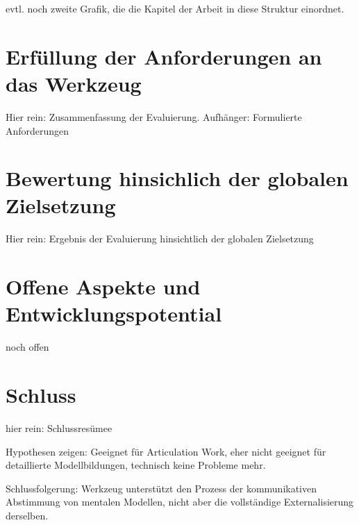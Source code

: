 evtl. noch zweite Grafik, die die Kapitel der Arbeit in diese Struktur einordnet.


\section{Erfüllung der Anforderungen an das Werkzeug}

Hier rein: Zusammenfassung der Evaluierung. Aufhänger: Formulierte Anforderungen

\section{Bewertung hinsichlich der globalen Zielsetzung}

Hier rein: Ergebnis der Evaluierung hinsichtlich der globalen Zielsetzung

\section{Offene Aspekte und Entwicklungspotential}

noch offen

\section{Schluss}

hier rein: Schlussresümee

Hypothesen zeigen: Geeignet für Articulation Work, eher nicht geeignet für detaillierte Modellbildungen, technisch keine Probleme mehr.

Schlussfolgerung: Werkzeug unterstützt den Prozess der kommunikativen Abstimmung von mentalen Modellen, nicht aber die vollständige Externalisierung derselben.

